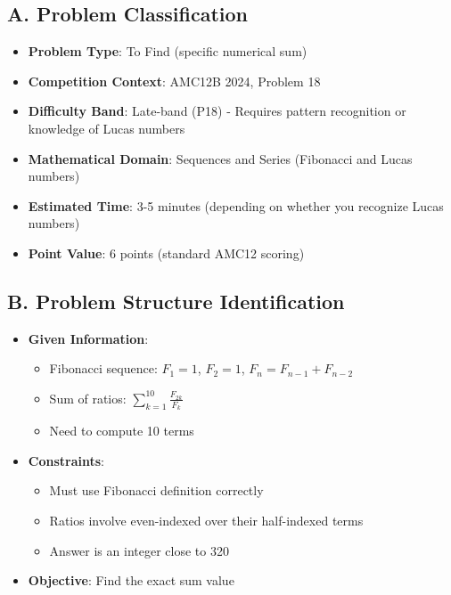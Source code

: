 \documentclass[12pt]{article}
\begin{document}
\begin{problemconfigbox}
\subsection*{A. Problem Classification}
\begin{itemize}[leftmargin=*]
    \item \textbf{Problem Type}: To Find (specific numerical sum)
    \item \textbf{Competition Context}: AMC12B 2024, Problem 18
    \item \textbf{Difficulty Band}: Late-band (P18) - Requires pattern recognition or knowledge of Lucas numbers
    \item \textbf{Mathematical Domain}: Sequences and Series (Fibonacci and Lucas numbers)
    \item \textbf{Estimated Time}: 3-5 minutes (depending on whether you recognize Lucas numbers)
    \item \textbf{Point Value}: 6 points (standard AMC12 scoring)
\end{itemize}

\subsection*{B. Problem Structure Identification}
\begin{itemize}[leftmargin=*]
    \item \textbf{Given Information}: 
    \begin{itemize}
        \item Fibonacci sequence: $F_1 = 1$, $F_2 = 1$, $F_n = F_{n-1} + F_{n-2}$
        \item Sum of ratios: $\sum_{k=1}^{10} \frac{F_{2k}}{F_k}$
        \item Need to compute 10 terms
    \end{itemize}
    
    \item \textbf{Constraints}: 
    \begin{itemize}
        \item Must use Fibonacci definition correctly
        \item Ratios involve even-indexed over their half-indexed terms
        \item Answer is an integer close to 320
    \end{itemize}
    
    \item \textbf{Objective}: Find the exact sum value
    

\end{itemize}
\end{problemconfigbox}
\end{document}
